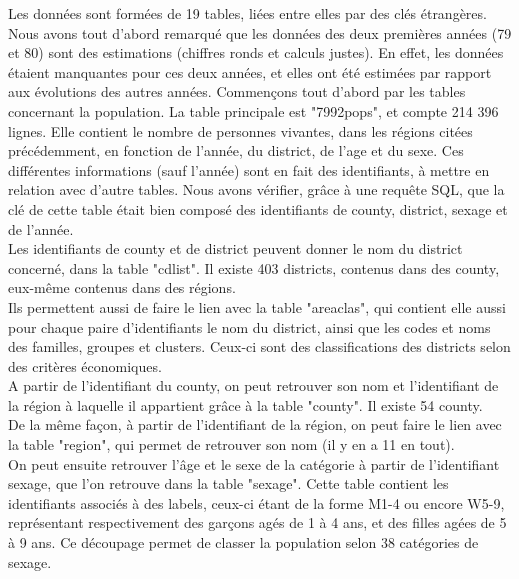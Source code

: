 \begin{paragraph}
Les données sont formées de 19 tables, liées entre elles par des clés étrangères. Nous avons tout d'abord remarqué que les données des deux premières années (79 et 80) sont des estimations (chiffres ronds et calculs justes). En effet, les données étaient manquantes pour ces deux années, et elles ont été estimées par rapport aux évolutions des autres années. Commençons tout d'abord par les tables concernant la population. La table principale est "7992pops", et compte 214 396 lignes. Elle contient le nombre de personnes vivantes, dans les régions citées précédemment, en fonction de l'année, du district, de l'age et du sexe. Ces différentes informations (sauf l'année) sont en fait des identifiants, à mettre en relation avec d'autre tables. Nous avons vérifier, grâce à une requête SQL, que la clé de cette table était bien composé des identifiants de county, district, sexage et de l'année.\\
Les identifiants de county et de district peuvent donner le nom du district concerné, dans la table "cdlist". Il existe 403 districts, contenus dans des county, eux-même contenus dans des régions. \\
Ils permettent aussi de faire le lien avec la table "areaclas", qui contient elle aussi pour chaque paire d'identifiants le nom du district, ainsi que les codes et noms des familles, groupes et clusters. Ceux-ci sont des classifications des districts selon des critères économiques. \\
A partir de l'identifiant du county, on peut retrouver son nom et l'identifiant de la région à laquelle il appartient grâce à la table "county". Il existe 54 county.\\
De la même façon, à partir de l'identifiant de la région, on peut faire le lien avec la table "region", qui permet de retrouver son nom (il y en a 11 en tout). \\
On peut ensuite retrouver l'âge et le sexe de la catégorie à partir de l'identifiant sexage, que l'on retrouve dans la table "sexage". Cette table contient les identifiants associés à des labels, ceux-ci étant de la forme M1-4 ou encore W5-9, représentant respectivement des garçons agés de 1 à 4 ans, et des filles agées de 5 à 9 ans. Ce découpage permet de classer la population selon 38 catégories de sexage.\\
\end{paragraph}


